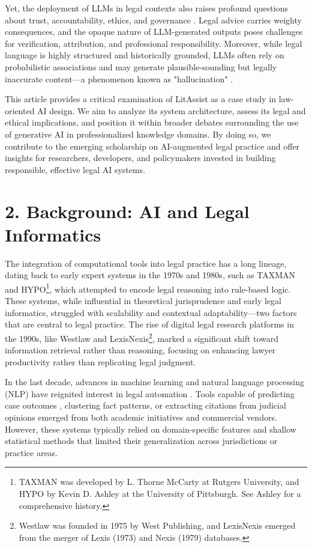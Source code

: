 \documentclass[12pt,a4paper]{article}
\begin{document}
Yet, the deployment of LLMs in legal contexts also raises profound questions about trust, accountability, ethics, and governance \cite{Binns2018}. Legal advice carries weighty consequences, and the opaque nature of LLM-generated outputs poses challenges for verification, attribution, and professional responsibility. Moreover, while legal language is highly structured and historically grounded, LLMs often rely on probabilistic associations and may generate plausible-sounding but legally inaccurate content—a phenomenon known as "hallucination" \cite{Zhao2021}.

This article provides a critical examination of LitAssist as a case study in law-oriented AI design. We aim to analyze its system architecture, assess its legal and ethical implications, and position it within broader debates surrounding the use of generative AI in professionalized knowledge domains. By doing so, we contribute to the emerging scholarship on AI-augmented legal practice and offer insights for researchers, developers, and policymakers invested in building responsible, effective legal AI systems.

\section*{2. Background: AI and Legal Informatics}

The integration of computational tools into legal practice has a long lineage, dating back to early expert systems in the 1970s and 1980s, such as TAXMAN and HYPO\footnote{TAXMAN was developed by L. Thorne McCarty at Rutgers University, and HYPO by Kevin D. Ashley at the University of Pittsburgh. See Ashley \cite{Ashley2017} for a comprehensive history.}, which attempted to encode legal reasoning into rule-based logic. These systems, while influential in theoretical jurisprudence and early legal informatics, struggled with scalability and contextual adaptability—two factors that are central to legal practice. The rise of digital legal research platforms in the 1990s, like Westlaw and LexisNexis\footnote{Westlaw was founded in 1975 by West Publishing, and LexisNexis emerged from the merger of Lexis (1973) and Nexis (1979) databases.}, marked a significant shift toward information retrieval rather than reasoning, focusing on enhancing lawyer productivity rather than replicating legal judgment.

In the last decade, advances in machine learning and natural language processing (NLP) have reignited interest in legal automation \cite{Surden2014}. Tools capable of predicting case outcomes \cite{Aletras2016, Katz2017}, clustering fact patterns, or extracting citations from judicial opinions emerged from both academic initiatives and commercial vendors. However, these systems typically relied on domain-specific features and shallow statistical methods that limited their generalization across jurisdictions or practice areas.
\end{document}
